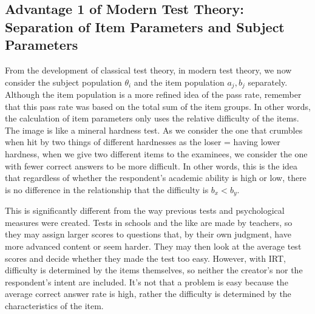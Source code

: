 \documentclass{ltjsbook}
\begin{document}
\subsection{Advantage 1 of Modern Test Theory: Separation of Item Parameters and Subject Parameters}
From the development of classical test theory, in modern test theory, we now consider the subject population $\theta_i$ and the item population $a_j, b_j$ separately. Although the item population is a more refined idea of the pass rate, remember that this pass rate was based on the total sum of the item groups.
In other words, the calculation of item parameters only uses the relative difficulty of the items. The image is like a mineral hardness test. As we consider the one that crumbles when hit by two things of different hardnesses as the loser = having lower hardness, when we give two different items to the examinees, we consider the one with fewer correct answers to be more difficult. In other words, this is the idea that regardless of whether the respondent's academic ability is high or low, there is no difference in the relationship that the difficulty is $b_x < b_y$.

This is significantly different from the way previous tests and psychological measures were created. Tests in schools and the like are made by teachers, so they may assign larger scores to questions that, by their own judgment, have more advanced content or seem harder. They may then look at the average test scores and decide whether they made the test too easy. However, with IRT, difficulty is determined by the items themselves, so neither the creator's nor the respondent's intent are included. It's not that a problem is easy because the average correct answer rate is high, rather the difficulty is determined by the characteristics of the item.
\end{document}
